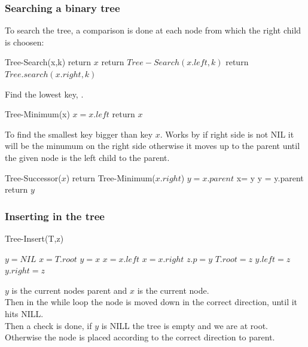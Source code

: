 \documentclass[12pt, a4paper]{article}
\begin{document}
				\subsubsection{Searching a binary tree}
					To search the tree, a comparison is done at each node from which the right child is choosen:
					\begin{algorithmic}[1]
						\State Tree-Search(x,k)
							\State return $x$
						\EndIf
							\State return $Tree-Search(x.left,k)$
						\Else
							\State return $Tree.search(x.right,k)$
						\EndIf
					\end{algorithmic}
					Find the lowest key, .					
					\begin{algorithmic}[1]
						\State Tree-Minimum(x)
							\State $x = x.left$
						\EndWhile
						\State return $x$
					\end{algorithmic}
					To find the smallest key bigger than key $x$. Works by if right side is not NIL it will be the minumum on the right side otherwise it moves up to the parent until the given node is the left child to the parent.
					\begin{algorithmic}[1]
						\State Tree-Successor($x$)
							\State return Tree-Minimum($x.right$)
						\EndIf
						\State $y=x.parent$
							\State x= y
							\State y = y.parent
						\EndWhile
						\State return $y$
					\end{algorithmic}
				\subsubsection{Inserting in the tree}
				\label{sec:BSTInsert}
					\begin{minipage}{0.49\textwidth}
						Tree-Insert(T,z)
						\begin{algorithmic}[1]
							\State $y = NIL$
							\State $x = T.root$
								\State $y = x$
									\State $x = x.left$
								\Else
									\State $x = x.right$
								\EndIf
							\EndWhile
							\State $z.p = y$
								\State $T.root = z$
								\State $y.left = z$
							\Else
								\State $y.right = z$
							\EndIf								
						\end{algorithmic}
					\end{minipage}
					\begin{minipage}{0.49\textwidth}
						$y$ is the current nodes parent and $x$ is the current node.\\
						Then in the while loop the node is moved down in the correct direction, until it hits NILL.\\
						Then a check is done, if $y$ is NILL the tree is empty and we are at root.\\
						Otherwise the node is placed according to the correct direction to parent.
					\end{minipage}
				\clearpage
\end{document}
